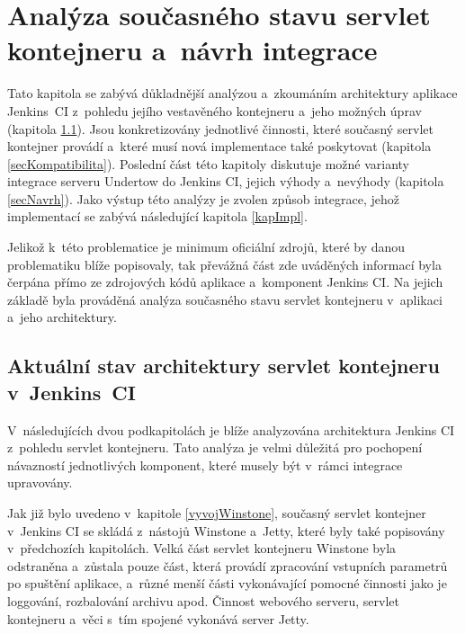 \chapter{Analýza současného stavu servlet kontejneru a~návrh integrace} \label{kapAnalyza}
    Tato kapitola se zabývá důkladnější analýzou a~zkoumáním architektury aplikace Jenkins~CI
    z~pohledu jejího vestavěného kontejneru a~jeho možných úprav (kapitola \ref{secArchitecture}). 
    Jsou konkretizovány jednotlivé činnosti, které současný servlet kontejner provádí
    a~které musí nová implementace také poskytovat (kapitola \ref{secKompatibilita}).
    Poslední část této kapitoly diskutuje možné varianty integrace serveru Undertow do Jenkins CI,
    jejich výhody a~nevýhody (kapitola \ref{secNavrh}). Jako výstup této analýzy je zvolen způsob integrace, jehož
    implementací se zabývá následující kapitola \ref{kapImpl}.

    Jelikož k~této problematice je minimum oficiální zdrojů, které by danou problematiku blíže popisovaly, 
    tak převážná část zde uváděných informací byla čerpána přímo ze zdrojových kódů aplikace a~komponent Jenkins CI.
    Na jejich základě byla prováděná analýza současného stavu servlet kontejneru v~aplikaci a~jeho architektury.
    
    \section{Aktuální stav architektury servlet kontejneru v~Jenkins~CI}\label{secArchitecture}
        V~následujících dvou podkapitolách je blíže analyzována architektura
        Jenkins CI z~pohledu servlet kontejneru. Tato analýza je velmi důležitá
        pro pochopení návazností jednotlivých komponent, které musely být v~rámci integrace upravovány.

        Jak již bylo uvedeno v~kapitole \ref{vyvojWinstone}, současný servlet kontejner 
        v~Jenkins CI se skládá z~nástojů Winstone a~Jetty, které byly také popisovány
        v~předchozích kapitolách. Velká část servlet
        kontejneru Winstone byla odstraněna a~zůstala pouze část, která
        provádí zpracování vstupních parametrů po spuštění aplikace, a~různé menší části
        vykonávající pomocné činnosti jako je loggování, rozbalování archivu apod. Činnost webového serveru, servlet kontejneru
        a~věci s~tím spojené vykonává server Jetty.
        

